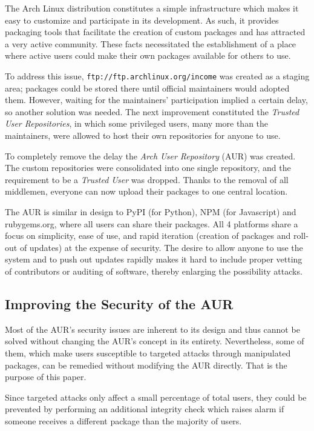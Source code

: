 \label{sec:intro}
The Arch Linux distribution constitutes a simple infrastructure which makes it easy to customize and participate in its development. As such, it provides packaging tools that facilitate the creation of custom packages and has attracted a very active community.
These facts necessitated the establishment of a place where active users could make their own packages available for others to use.

To address this issue, \texttt{ftp://ftp.archlinux.org/income} was created as a staging area; packages could be stored there until official maintainers would adopted them. However, waiting for the maintainers' participation implied a certain delay, so another solution was needed.
The next improvement constituted the \emph{Trusted User Repositories}, in which some privileged users, many more than the maintainers, were allowed to host their own repositories for anyone to use.

To completely remove the delay the \emph{Arch User Repository} (AUR) was created. The custom repositories were consolidated into one single repository, and the requirement to be a \emph{Trusted User} was dropped.
Thanks to the removal of all middlemen, everyone can now upload their packages to one central location. \cite{wiki:AUR}

The AUR is similar in design to PyPI (for Python), NPM (for Javascript) and rubygems.org, where all users can share their packages. All 4 platforms share a focus on simplicity, ease of use, and rapid iteration (creation of packages and roll-out of updates) at the expense of security.
The desire to allow anyone to use the system and to push out updates rapidly makes it hard to include proper vetting of contributors or auditing of software, thereby enlarging the possibility attacks.

\subsection*{Improving the Security of the AUR}
Most of the AUR's security issues are inherent to its design and thus cannot be solved without changing the AUR's concept in its entirety.
Nevertheless, some of them, which make users susceptible to targeted attacks through manipulated packages, can be remedied without modifying the AUR directly. That is the purpose of this paper.

Since targeted attacks only affect a small percentage of total users, they could be prevented by performing an additional integrity check which raises alarm if someone receives a different package than the majority of users.

